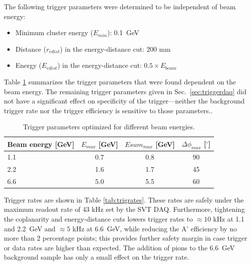The following trigger parameters were determined to be independent of beam energy:
\begin{itemize}
	\item Minimum cluster energy ($E_{min}$): 0.1~GeV
	\item Distance ($r_{edist}$) in the energy-distance cut: 200 mm
	\item Energy ($E_{edist}$) in the energy-distance cut: $0.5\times E_{beam}$
\end{itemize}

Table \ref{tab:trigcuts} summarizes the trigger parameters that were found dependent on the beam energy. 
The remaining trigger parameters given in Sec.~\ref{sec:triggerdaq} did not have a significant 
effect on specificity of the trigger---neither the background trigger rate nor the trigger efficiency is sensitive to those parameters..

\begin{table}
	\begin{tabular}{|l|c|c|c|}
		\hline
		Beam energy [GeV] & $E_{max}$ [GeV] & $Esum_{max}$ [GeV] & $\Delta\phi_{max}$ [$^\circ$] \\
		\hline
		1.1	&	0.7	&	0.8	&	90\\
		2.2	&	1.6	&	1.7	&	45\\
		6.6	&	5.0	&	5.5	&	60\\
		\hline
	\end{tabular}
	\caption{ {\small Trigger parameters optimized for different beam energies.}
	\label{tab:trigcuts}}
\end{table}

Trigger rates are shown in Table \ref{tab:trigrates}. These rates are safely under the maximum readout rate of 43 kHz set by the SVT DAQ. 
Furthermore, tightening the coplanarity and energy-distance cuts lowers trigger rates to $\approx 10$ kHz at 1.1 and 2.2~GeV and $\approx 5$ kHz at 6.6~GeV, while reducing the A' efficiency by no more than 2 percentage points; this provides further safety margin in case trigger or data rates are higher than expected.
The addition of pions to the 6.6~GeV background sample has only a small effect on the trigger rate.

